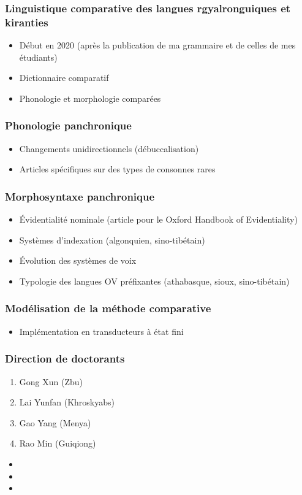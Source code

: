 \documentclass[xcolor=table]{beamer}
\begin{document}
   \begin{frame} 
 \frametitle{Linguistique comparative des langues rgyalronguiques et kiranties} 
 \begin{itemize}%
 \item Début en 2020 (après la publication de ma grammaire et de celles de mes étudiants)
  \item Dictionnaire comparatif
  \item Phonologie et morphologie comparées
\end{itemize}
   \end{frame} 

   \begin{frame} 
 \frametitle{Phonologie panchronique} 
 \begin{itemize}%
 \item Changements unidirectionnels (débuccalisation)
 \item Articles spécifiques sur des types de consonnes rares
\end{itemize}
   \end{frame} 

   \begin{frame} 
 \frametitle{Morphosyntaxe panchronique} 
 \begin{itemize}%
 \item Évidentialité nominale (article pour le Oxford Handbook of Evidentiality)
 \item Systèmes d'indexation (algonquien, sino-tibétain)
 \item Évolution des systèmes de voix
 \item Typologie des langues OV préfixantes (athabasque, sioux, sino-tibétain)
\end{itemize}
   \end{frame} 

   \begin{frame} 
 \frametitle{Modélisation de la méthode comparative} 
 \begin{itemize}%
 \item  Implémentation en transducteurs à état fini
\end{itemize}
   \end{frame} 

  \begin{frame} 
 \frametitle{Direction de doctorants} 

\begin{enumerate}
\item Gong Xun (Zbu)
\item Lai Yunfan (Khroskyabs)
\item Gao Yang (Menya)
\item Rao Min (Guiqiong)
\end{enumerate}

\begin{itemize}
\item  {}
\item  {}  
\item  {}
\end{itemize}   
  \end{frame}   
\end{document}
